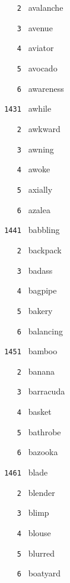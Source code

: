 \documentclass[11pt]{article}
\begin{document}
\begin{multicols}{6}
\noindent \texttt{ \ \ \ 2 } avalanche  \par
\noindent \texttt{ \ \ \ 3 } avenue  \par
\noindent \texttt{ \ \ \ 4 } aviator  \par
\noindent \texttt{ \ \ \ 5 } avocado  \par
\noindent \texttt{ \ \ \ 6 } awareness  \par
\vspace{3mm}
\noindent \texttt{ 1431 } awhile  \par
\noindent \texttt{ \ \ \ 2 } awkward  \par
\noindent \texttt{ \ \ \ 3 } awning  \par
\noindent \texttt{ \ \ \ 4 } awoke  \par
\noindent \texttt{ \ \ \ 5 } axially  \par
\noindent \texttt{ \ \ \ 6 } azalea  \par
\vspace{3mm}
\noindent \texttt{ 1441 } babbling  \par
\noindent \texttt{ \ \ \ 2 } backpack  \par
\noindent \texttt{ \ \ \ 3 } badass  \par
\noindent \texttt{ \ \ \ 4 } bagpipe  \par
\noindent \texttt{ \ \ \ 5 } bakery  \par
\noindent \texttt{ \ \ \ 6 } balancing  \par
\vspace{3mm}
\noindent \texttt{ 1451 } bamboo  \par
\noindent \texttt{ \ \ \ 2 } banana  \par
\noindent \texttt{ \ \ \ 3 } barracuda  \par
\noindent \texttt{ \ \ \ 4 } basket  \par
\noindent \texttt{ \ \ \ 5 } bathrobe  \par
\noindent \texttt{ \ \ \ 6 } bazooka  \par
\vspace{3mm}
\noindent \texttt{ 1461 } blade  \par
\noindent \texttt{ \ \ \ 2 } blender  \par
\noindent \texttt{ \ \ \ 3 } blimp  \par
\noindent \texttt{ \ \ \ 4 } blouse  \par
\noindent \texttt{ \ \ \ 5 } blurred  \par
\noindent \texttt{ \ \ \ 6 } boatyard  \par

\end{multicols}
\end{document}
